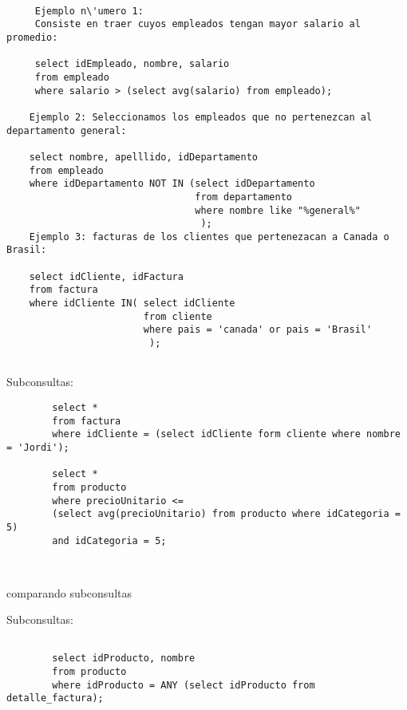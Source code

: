 \begin{ejemplo}
	\begin{verbatim}
		
	 Ejemplo n\'umero 1: 
	 Consiste en traer cuyos empleados tengan mayor salario al promedio: 
	 
	 select idEmpleado, nombre, salario
	 from empleado
	 where salario > (select avg(salario) from empleado);

	Ejemplo 2: Seleccionamos los empleados que no pertenezcan al departamento general: 
	
	select nombre, apelllido, idDepartamento
	from empleado
	where idDepartamento NOT IN (select idDepartamento 
	                             from departamento
	                             where nombre like "%general%"
	                              );
	Ejemplo 3: facturas de los clientes que pertenezacan a Canada o Brasil:
	
	select idCliente, idFactura
	from factura
	where idCliente IN( select idCliente 
						from cliente
						where pais = 'canada' or pais = 'Brasil'
						 );
	
	\end{verbatim}
\end{ejemplo}


Subconsultas: 

\begin{ejemplo}
	\begin{verbatim}
		select *
		from factura
		where idCliente = (select idCliente form cliente where nombre = 'Jordi');
		
		select *
		from producto 
		where precioUnitario <= 
		(select avg(precioUnitario) from producto where idCategoria = 5)
		and idCategoria = 5;
		
		
	\end{verbatim}
\end{ejemplo}

comparando subconsultas

Subconsultas: 

\begin{ejemplo}
	\begin{verbatim}
		
		select idProducto, nombre
		from producto
		where idProducto = ANY (select idProducto from detalle_factura);
		
		
	\end{verbatim}
\end{ejemplo}